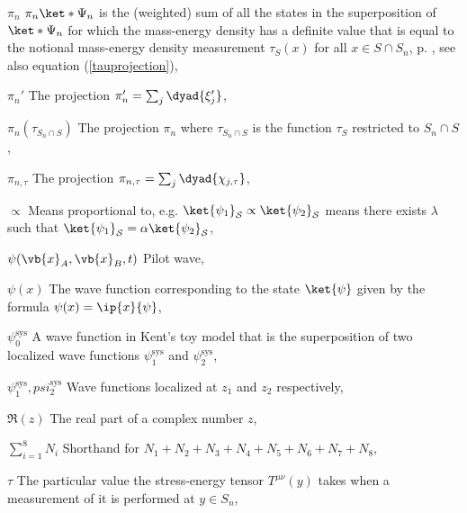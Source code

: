 \begin{thenomenclature}
      \item [{$\pi_n$}]\begingroup $\pi_n \ket*{\Psi_n}$ is the (weighted) sum of all the states in the superposition of $\ket*{\Psi_n}$ for which the mass-energy density has a definite value that is equal to the notional mass-energy density measurement $\tau_S(x)$ for all $x\in S\cap S_n$, p. \pageref{overviewpi}, see also equation (\ref{tauprojection}), \nomrefpage{}
      \item [{$\pi_n'$}]\begingroup The projection $\pi_n'=\sum_j\dyad{\xi_j'}$, \nomrefpage{}
      \item [{$\pi_n(\tau_{S_n\cap S})$}]\begingroup The projection $\pi_n$ where $\tau_{S_n\cap S}$ is the function $\tau_S$ restricted to $S_n\cap S$, \nomrefpage{}
      \item [{$\pi_{n,\tau}$}]\begingroup The projection $\pi_{n,\tau}=\sum_j\dyad{\chi_{j,\tau}}$, \nomrefpage{}
      \item [{$\propto $}]\begingroup Means proportional to, e.g. $\ket {\psi _1}_\mathcal {S}\propto \ket {\psi _2}_\mathcal {S}$ means there exists $\lambda $ such that $\ket {\psi _1}_\mathcal {S}=\alpha \ket {\psi _2}_\mathcal {S}$, \nomrefpage {}
      \item [{$\psi(\vb{x}_A, \vb{x}_B, t)$}]\begingroup Pilot wave, \nomrefpage{}
      \item [{$\psi(x)$}]\begingroup The wave function corresponding to the state $\ket{\psi}$ given by the formula $\psi(x)=\ip{x}{\psi}$,  \nomrefpage{}
      \item [{$\psi_0^\text{sys}$}]\begingroup A wave function in Kent's toy model that is the superposition of two localized wave functions $\psi_1^\text{sys}$ and $\psi_2^\text{sys}$, \nomrefpage{}
      \item [{$\psi_1^\text{sys}, psi_2^\text{sys}$}]\begingroup Wave functions localized at $z_1$ and $z_2$ respectively, \nomrefpage{}
      \item [{$\Re(z)$}]\begingroup The real part of a complex number $z$,  \nomrefpage{}
      \item [{$\sum _{i=1}^8 N_i$}]\begingroup Shorthand for $N_1+N_2+N_3+N_4+N_5+N_6+N_7+N_8$, \nomrefpage {}
      \item [{$\tau$}]\begingroup The particular value the stress-energy tensor $T^{\mu\nu}(y)$ takes when a measurement of it is performed at $y\in S_n$, \nomrefpage{}

\end{thenomenclature}
